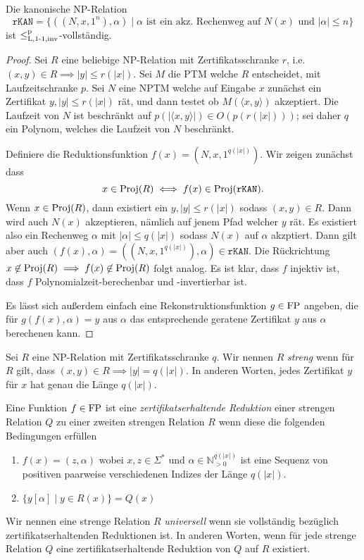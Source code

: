 \begin{theorem}
    Die kanonische NP-Relation
    \[ \mathtt{rKAN} = \{ ((N,x,1^n), \alpha) \mid \text{$\alpha$ ist ein akz. Rechenweg auf $N(x)$ und $|\alpha|\leq n$} \} \]
    ist $\leq_\mathrm{L,1\text{-}1,inv}^\mathrm p$-vollständig.
\end{theorem}
\begin{proof}
    Sei $R$ eine beliebige NP-Relation mit Zertifikatsschranke $r$, i.e. $(x,y)\in R\implies |y|\leq r(|x|)$. Sei $M$ die PTM welche $R$ entscheidet, mit Laufzeitschranke $p$. Sei $N$ eine NPTM welche auf Eingabe $x$ zunächst ein Zertifikat $y, |y|\leq r(|x|)$ rät, und dann testet ob $M(\langle x,y\rangle )$ akzeptiert. Die Laufzeit von $N$ ist beschränkt auf $p(|\langle x,y\rangle|)\in O(p(r(|x|)))$; sei daher $q$ ein Polynom, welches die Laufzeit von $N$ beschränkt.

    Definiere die Reduktionsfunktion $f(x)=(N, x, 1^{q(|x|)})$. Wir zeigen zunächst dass
    \[ x\in \operatorname{Proj}(R)\iff f(x)\in \operatorname{Proj}(\mathtt{rKAN}). \]
    Wenn $x\in\operatorname{Proj}(R)$, dann existiert ein $y, |y|\leq r(|x|)$ sodass $(x,y)\in R$. Dann wird auch $N(x)$ akzeptieren, nämlich auf jenem Pfad welcher $y$ rät. Es existiert also ein Rechenweg $\alpha$ mit $|\alpha|\leq q(|x|)$ sodass $N(x)$ auf $\alpha$ akzptiert. Dann gilt aber auch $(f(x), \alpha)=((N,x,1^{q(|x|)}),\alpha)\in \mathtt{rKAN}$.
    Die Rückrichtung $x\not\in \operatorname{Proj}(R)\implies f(x)\not\in\operatorname{Proj}(R)$ folgt analog.
    Es ist klar, dass $f$ injektiv ist, dass $f$ Polynomialzeit-berechenbar und -invertierbar ist. 

    Es lässt sich außerdem einfach eine Rekonstruktionsfunktion $g\in \mathrm{FP}$ angeben, die für $g(f(x), \alpha)=y$ aus $\alpha$ das entsprechende geratene Zertifikat $y$ aus $\alpha$ berechenen kann.
\end{proof}

\begin{definition}
    Sei $R$ eine NP-Relation mit Zertifikatsschranke $q$. 
    Wir nennen $R$ \emph{streng} wenn für $R$ gilt, dass $(x,y)\in R\implies |y|=q(|x|)$. In anderen Worten, jedes Zertifikat $y$ für $x$ hat genau die Länge $q(|x|)$.

    Eine Funktion $f\in \mathrm{FP}$ ist eine \emph{zertifikatserhaltende Reduktion} einer strengen Relation $Q$ zu einer zweiten strengen Relation $R$ wenn diese die folgenden Bedingungen erfüllen
    \begin{enumerate}
        \item $f(x)=(z,\alpha)$ wobei $x,z\in\Sigma^*$ und $\alpha\in\mathbb N_{>0}^{q(|x|)}$ ist eine Sequenz von positiven paarweise verschiedenen  Indizes der Länge $q(|x|)$.
        \item $\{ y[\alpha] \mid y\in R(x) \} = Q(x)$
    \end{enumerate}

    Wir nennen eine strenge Relation $R$ \emph{universell} wenn sie vollständig bezüglich zertifikatserhaltenden Reduktionen ist. In anderen Worten, wenn für jede strenge Relation $Q$ eine zertifikatserhaltende Reduktion von $Q$ auf $R$ existiert.
\end{definition}

